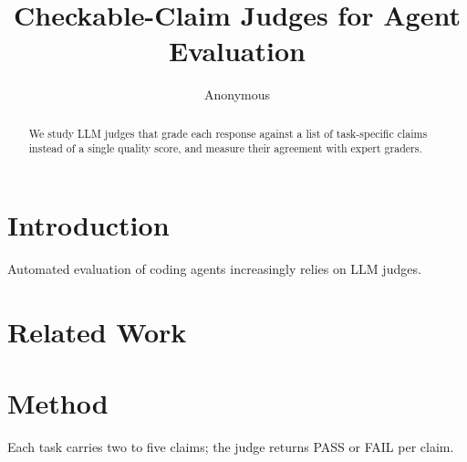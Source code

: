 \documentclass{article}
\title{Checkable-Claim Judges for Agent Evaluation}
\author{Anonymous}
\date{}
\begin{document}
\maketitle

\begin{abstract}
We study LLM judges that grade each response against a list of task-specific claims instead of a
single quality score, and measure their agreement with expert graders.
\end{abstract}

\section{Introduction}
Automated evaluation of coding agents increasingly relies on LLM judges.

\section{Related Work}

\section{Method}
Each task carries two to five claims; the judge returns PASS or FAIL per claim.



\end{document}
